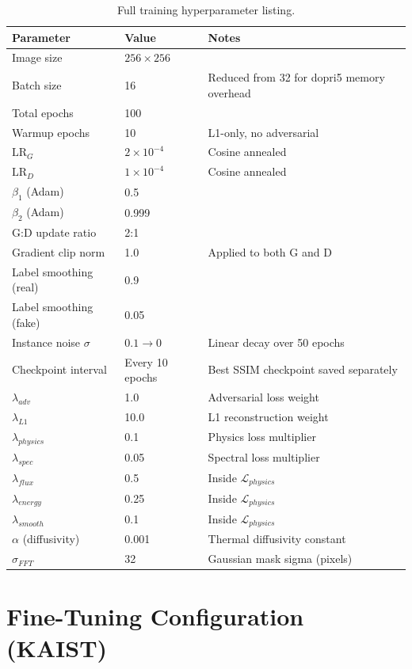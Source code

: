 \begin{table}[htbp]
\centering
\caption{Full training hyperparameter listing.}
\label{tab:app_train}
\begin{tabular}{lll}
\toprule
\textbf{Parameter} & \textbf{Value} & \textbf{Notes} \\
\midrule
Image size & $256 \times 256$ & \\
Batch size & 16 & Reduced from 32 for dopri5 memory overhead \\
Total epochs & 100 & \\
Warmup epochs & 10 & L1-only, no adversarial \\
$\text{LR}_G$ & $2 \times 10^{-4}$ & Cosine annealed \\
$\text{LR}_D$ & $1 \times 10^{-4}$ & Cosine annealed \\
$\beta_1$ (Adam) & 0.5 & \\
$\beta_2$ (Adam) & 0.999 & \\
G:D update ratio & 2:1 & \\
Gradient clip norm & 1.0 & Applied to both G and D \\
Label smoothing (real) & 0.9 & \\
Label smoothing (fake) & 0.05 & \\
Instance noise $\sigma$ & $0.1 \to 0$ & Linear decay over 50 epochs \\
Checkpoint interval & Every 10 epochs & Best SSIM checkpoint saved separately \\
\midrule
$\lambda_{adv}$ & 1.0 & Adversarial loss weight \\
$\lambda_{L1}$ & 10.0 & L1 reconstruction weight \\
$\lambda_{physics}$ & 0.1 & Physics loss multiplier \\
$\lambda_{spec}$ & 0.05 & Spectral loss multiplier \\
$\lambda_{flux}$ & 0.5 & Inside $\mathcal{L}_{physics}$ \\
$\lambda_{energy}$ & 0.25 & Inside $\mathcal{L}_{physics}$ \\
$\lambda_{smooth}$ & 0.1 & Inside $\mathcal{L}_{physics}$ \\
$\alpha$ (diffusivity) & 0.001 & Thermal diffusivity constant \\
$\sigma_{FFT}$ & 32 & Gaussian mask sigma (pixels) \\
\bottomrule
\end{tabular}
\end{table}

\section{Fine-Tuning Configuration (KAIST)}

